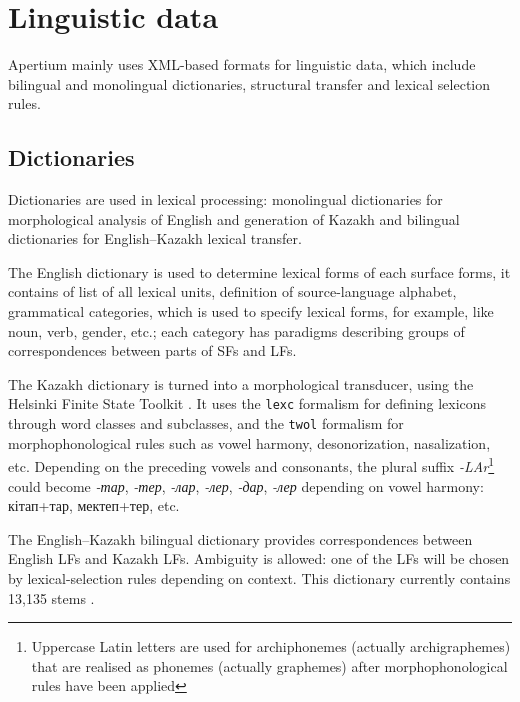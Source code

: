 \documentclass[11pt]{article}
\begin{document}
\section{Linguistic data}

Apertium mainly uses XML-based formats for linguistic data, which include bilingual and monolingual dictionaries, structural transfer and
lexical selection rules. 

\subsection{Dictionaries}

Dictionaries are used in lexical processing: monolingual dictionaries
for morphological analysis of English and generation of Kazakh and
bilingual dictionaries for English--Kazakh lexical transfer.  

The English dictionary is used to determine lexical forms of each surface
forms, it contains of list of all lexical units, definition of
source-language alphabet, grammatical categories, which is used to
specify lexical forms, for example, like noun, verb, gender, etc.;
each category has paradigms describing groups of correspondences
between parts of SFs and LFs.  

The Kazakh dictionary is turned into a
morphological transducer, using the Helsinki Finite
State Toolkit \citep{hfst/2011}. It uses the \texttt{lexc} formalism
for defining lexicons through word classes and subclasses, and the
\texttt{twol} formalism for morphophonological rules such as vowel
harmony, desonorization, nasalization, etc.  Depending on the
preceding vowels and consonants, the plural suffix \emph{-LAr}\footnote{Uppercase Latin letters are used for archiphonemes (actually archigraphemes) that are realised as phonemes (actually graphemes) after morphophonological rules have been applied} could
become \emph{-тар}, \emph{-тер}, \emph{-лар}, \emph{-лер}, \emph{-дар}, \emph{-лер} depending on vowel harmony: кітап+тар,
мектеп+тер, etc. 



The English--Kazakh bilingual dictionary provides correspondences between English LFs and Kazakh LFs. Ambiguity is allowed: one of the LFs will be chosen by 
lexical-selection rules depending on context. This dictionary currently contains 13,135 stems \citep{sundetova13a}.
\end{document}

